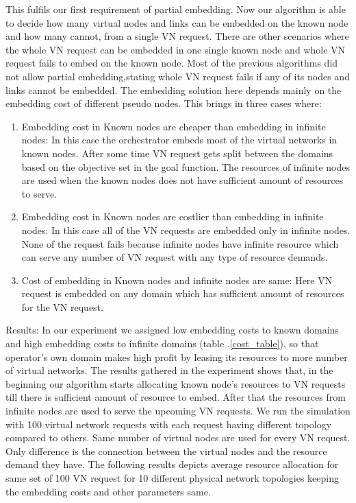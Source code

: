 \documentclass[article,dr=phil,type=msc ,colorback,accentcolor=tud4b]{tudthesis}
\begin{document}
This fulfils our first requirement of partial embedding. Now our algorithm is able to decide how many virtual nodes and links can be embedded on the known node and how many cannot, from a single VN request. There are other scenarios where the whole VN request can be embedded in one single known node and whole VN request fails to embed on the known node. Most of the previous algorithms did not allow partial embedding,stating whole VN request fails if any of its nodes and links cannot be embedded. The embedding solution here depends mainly on the embedding cost of different pseudo nodes. This brings in three cases where:
\begin{enumerate}
\item Embedding cost in Known nodes are cheaper than embedding in infinite nodes: In this case the orchestrator embeds most of the virtual networks in known nodes. After some time VN request gets split between the domains based on the objective set in the goal function. The resources of infinite nodes are used when the known nodes does not have sufficient amount of resources to serve.
	
\item  Embedding cost in Known nodes are costlier than embedding in infinite nodes: In this case all of the VN requests are embedded only in infinite nodes. None of the request fails because infinite nodes have infinite resource which can serve any number of VN request with any type of resource demands.

\item Cost of embedding in Known nodes and infinite nodes are same: Here VN request is embedded on any domain which has sufficient amount of resources for the VN request. 
\end{enumerate}

Results: 
In our experiment we assigned low embedding costs to known domains and high embedding costs to infinite domains (table .\ref{cost_table}), so that operator's own domain makes high profit by leasing its resources to more number of virtual networks. The results gathered in the experiment shows that, in the beginning our algorithm starts allocating known node's resources to VN requests till there is sufficient amount of resource to embed. After that  
the resources from infinite nodes are used to serve the upcoming VN requests. We run the simulation with 100 virtual network requests with each request having different topology compared to others. Same number of virtual nodes are used for every VN request. Only difference is the connection between the virtual nodes and the resource demand they have. The following results depicts average resource allocation for same set of 100 VN request for 10 different physical network topologies keeping the embedding costs and other parameters same.
\end{document}
